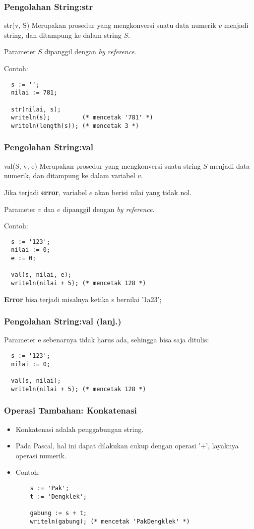 \begin{frame}[fragile]
\frametitle{Pengolahan String:\newline str}
\begin{block}{str(v, S)}
Merupakan prosedur yang mengkonversi suatu data numerik $v$ menjadi string, dan ditampung ke dalam string $S$.

Parameter $S$ dipanggil dengan \textit{by reference}.
\end{block}
Contoh:
\begin{lstlisting}
  s := '';
  nilai := 781;

  str(nilai, s);
  writeln(s);         (* mencetak '781' *)
  writeln(length(s)); (* mencetak 3 *)
\end{lstlisting}
\end{frame}

\begin{frame}[fragile]
\frametitle{Pengolahan String:\newline val}
\begin{block}{val(S, v, e)}
Merupakan prosedur yang mengkonversi suatu string $S$ menjadi data numerik, dan ditampung ke dalam variabel $v$.

Jika terjadi \textbf{error}, variabel $e$ akan berisi nilai yang tidak nol.

Parameter $v$ dan $e$ dipanggil dengan \textit{by reference}.
\end{block}
Contoh:
\begin{lstlisting}
  s := '123';
  nilai := 0;
  e := 0;

  val(s, nilai, e);
  writeln(nilai + 5); (* mencetak 128 *)
\end{lstlisting}

\textbf{Error} bisa terjadi misalnya ketika s bernilai '1a23';
\end{frame}

\begin{frame}[fragile]
\frametitle{Pengolahan String:\newline val (lanj.)}
Parameter e sebenarnya tidak harus ada, sehingga bisa saja ditulis:
\begin{lstlisting}
  s := '123';
  nilai := 0;

  val(s, nilai);
  writeln(nilai + 5); (* mencetak 128 *)
\end{lstlisting}
\end{frame}

\begin{frame}[fragile]
\frametitle{Operasi Tambahan: Konkatenasi}
\begin{itemize}
  \item Konkatenasi adalah penggabungan string.
  \item Pada Pascal, hal ini dapat dilakukan cukup dengan operasi '+', layaknya operasi numerik.
  \item Contoh:
  \begin{lstlisting}
    s := 'Pak';
    t := 'Dengklek';

    gabung := s + t;
    writeln(gabung); (* mencetak 'PakDengklek' *)
  \end{lstlisting}
\end{itemize}
\end{frame}

